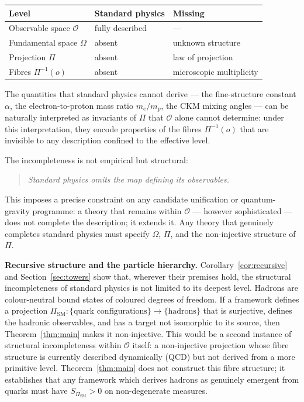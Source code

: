 \documentclass[12pt,a4paper]{article}
\begin{document}
  \begin{center}
    \begin{tabular}{lll}
      \hline
      Level                          & Standard physics & Missing                  \\
      \hline
      Observable space $\mathcal{O}$ & fully described  & ---                      \\
      Fundamental space $\Omega$     & absent           & unknown structure        \\
      Projection $\Pi$               & absent           & law of projection        \\
      Fibres $\Pi^{-1}(o)$           & absent           & microscopic multiplicity \\
      \hline
    \end{tabular}
  \end{center}

  The quantities that standard physics cannot derive --- the fine-structure
  constant $\alpha$, the electron-to-proton mass ratio $m_e/m_p$, the CKM
  mixing angles --- can be naturally interpreted as invariants of $\Pi$ that
  $\mathcal{O}$ alone cannot determine: under this interpretation, they encode
  properties of the fibres $\Pi^{-1}(o)$ that are invisible to any description
  confined to the effective level.

  The incompleteness is not empirical but structural:
  \begin{quote}
    \emph{Standard physics omits the map defining its observables.}
  \end{quote}
  This imposes a precise constraint on any candidate unification or
  quantum-gravity programme: a theory that remains within $\mathcal{O}$ ---
  however sophisticated --- does not complete the description; it extends it.
  Any theory that genuinely completes standard physics must specify $\Omega$,
  $\Pi$, and the non-injective structure of $\Pi$.

  \textbf{Recursive structure and the particle hierarchy.}
  Corollary~\ref{cor:recursive} and Section~\ref{sec:towers} show that, wherever their
  premises hold, the structural incompleteness of standard physics is not limited to its deepest level.
  Hadrons are colour-neutral bound states of coloured degrees of freedom.
  If a framework defines a projection
  $\Pi_{\mathrm{SM}} : \{\text{quark configurations}\} \to \{\text{hadrons}\}$ that is surjective,
  defines the hadronic observables, and has a target not isomorphic to its source, then
  Theorem~\ref{thm:main} makes it non-injective.
  This would be a second instance of structural incompleteness within $\mathcal{O}$ itself:
  a non-injective projection whose fibre structure is currently described dynamically
  (QCD) but not derived from a more primitive level.
  Theorem~\ref{thm:main} does not construct this fibre structure; it establishes that
  any framework which derives hadrons as genuinely emergent from quarks must have
  $S_{\Pi_{\mathrm{SM}}} > 0$ on non-degenerate measures.
\end{document}
